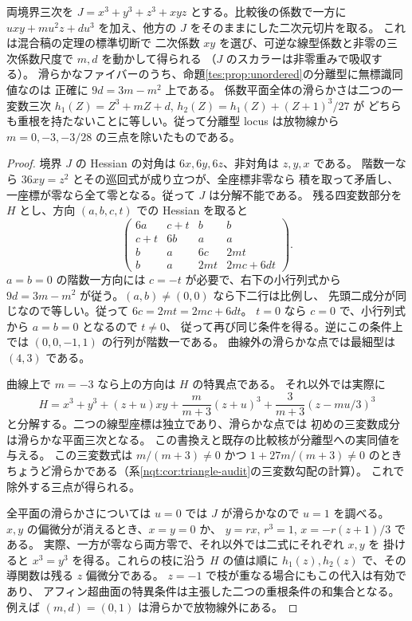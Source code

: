 \begin{corollary}[非零二次結合を持つ分離型の方程式]\label{tes:cor:quadratic-parabola}
両境界三次を $J=x^3+y^3+z^3+xyz$ とする。比較後の係数で一方に
$u xy+mu^2 z+du^3$ を加え、他方の $J$ をそのままにした二次元切片を取る。
これは混合稿の定理の標準切断で
二次係数 $xy$ を選び、可逆な線型係数と非零の三次係数尺度で $m,d$ を動かして得られる
（$J$ のスカラーは非零重みで吸収する）。
滑らかなファイバーのうち、命題\ref{tes:prop:unordered}の分離型に無標識同値なのは
正確に $9d=3m-m^2$ 上である。
係数平面全体の滑らかさは二つの一変数三次
$h_1(Z)=Z^3+mZ+d$, $h_2(Z)=h_1(Z)+(Z+1)^3/27$ が
どちらも重根を持たないことに等しい。従って分離型 locus は放物線から
$m=0,-3,-3/28$ の三点を除いたものである。
\end{corollary}
\begin{proof}
境界 $J$ の Hessian の対角は $6x,6y,6z$、非対角は $z,y,x$ である。
階数一なら $36xy=z^2$ とその巡回式が成り立つが、全座標非零なら
積を取って矛盾し、一座標が零なら全て零となる。従って $J$ は分解不能である。
残る四変数部分を $H$ とし、方向 $(a,b,c,t)$ での Hessian を取ると
\[
 \begin{pmatrix}
 6a&c+t&b&b\\ c+t&6b&a&a\\ b&a&6c&2mt\\ b&a&2mt&2mc+6dt
 \end{pmatrix}.
\]
$a=b=0$ の階数一方向には $c=-t$ が必要で、右下の小行列式から
$9d=3m-m^2$ が従う。$(a,b)\ne(0,0)$ なら下二行は比例し、
先頭二成分が同じなので等しい。従って $6c=2mt=2mc+6dt$。
$t=0$ なら $c=0$ で、小行列式から $a=b=0$ となるので $t\ne0$、
従って再び同じ条件を得る。逆にこの条件上では $(0,0,-1,1)$ の行列が階数一である。
曲線外の滑らかな点では最細型は $(4,3)$ である。

曲線上で $m=-3$ なら上の方向は $H$ の特異点である。
それ以外では実際に
\[
 H=x^3+y^3+(z+u)xy+
      \frac{m}{m+3}(z+u)^3+\frac{3}{m+3}(z-mu/3)^3
\]
と分解する。二つの線型座標は独立であり、滑らかな点では
初めの三変数成分は滑らかな平面三次となる。
この書換えと既存の比較核が分離型への実同値を与える。
この三変数式は $m/(m+3)\ne0$ かつ $1+27m/(m+3)\ne0$
のときちょうど滑らかである（系\ref{nqt:cor:triangle-audit}の三変数勾配の計算）。
これで除外する三点が得られる。

全平面の滑らかさについては $u=0$ では $J$ が滑らかなので $u=1$ を調べる。
$x,y$ の偏微分が消えるとき、$x=y=0$ か、
$y=rx$, $r^3=1$, $x=-r(z+1)/3$ である。
実際、一方が零なら両方零で、それ以外では二式にそれぞれ $x,y$ を
掛けると $x^3=y^3$ を得る。これらの枝に沿う $H$ の値は順に
$h_1(z),h_2(z)$ で、その導関数は残る $z$ 偏微分である。
$z=-1$ で枝が重なる場合にもこの代入は有効であり、
アフィン超曲面の特異条件は主張した二つの重根条件の和集合となる。
例えば $(m,d)=(0,1)$ は滑らかで放物線外にある。
\end{proof}
